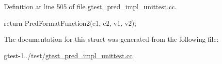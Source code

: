 \-Definition at line 505 of file gtest\-\_\-pred\-\_\-impl\-\_\-unittest.\-cc.


\begin{DoxyCode}
                                                          {
    return PredFormatFunction2(e1, e2, v1, v2);
  }
\end{DoxyCode}


\-The documentation for this struct was generated from the following file\-:\begin{DoxyCompactItemize}
\item 
gtest-\/1../test/\hyperlink{gtest__pred__impl__unittest_8cc}{gtest\-\_\-pred\-\_\-impl\-\_\-unittest.\-cc}\end{DoxyCompactItemize}
